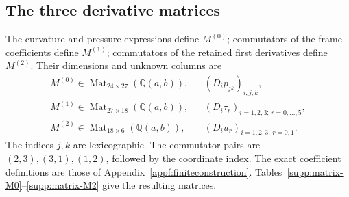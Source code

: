 \subsection{The three derivative matrices}

The curvature and pressure expressions define $M^{(0)}$; commutators
of the frame coefficients define $M^{(1)}$; commutators of the
retained first derivatives define $M^{(2)}$. Their dimensions and
unknown columns are
\[
\begin{array}{ccl}
 M^{(0)}\in\operatorname{Mat}_{24\times27}(\mathbb Q(a,b)),
 & & (D_ip_{jk})_{i,j,k},\\
 M^{(1)}\in\operatorname{Mat}_{27\times18}(\mathbb Q(a,b)),
 & & (D_i\tau_r)_{i=1,2,3;\,r=0,\ldots,5},\\
 M^{(2)}\in\operatorname{Mat}_{18\times6}(\mathbb Q(a,b)),
 & & (D_iu_r)_{i=1,2,3;\,r=0,1}.
\end{array}
\]
The indices $j,k$ are lexicographic. The commutator pairs are
$(2,3),(3,1),(1,2)$, followed by the coordinate index. The exact
coefficient definitions are those of Appendix~\ref{appf:finiteconstruction}.
Tables~\ref{supp:matrix-M0}--\ref{supp:matrix-M2} give the resulting matrices.


